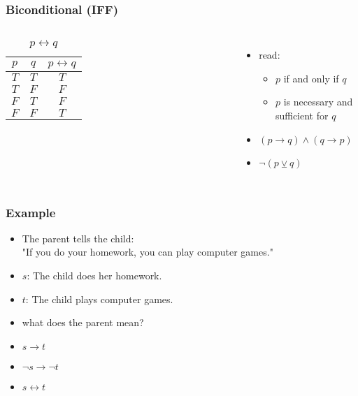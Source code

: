\documentclass[dvipsnames]{beamer}
\begin{document}
\begin{frame}
  \frametitle{Biconditional (IFF)}

  \begin{columns}
    \begin{table}
      \caption{$p \leftrightarrow q$}
      \begin{tabular}{|c|c||c|}\hline
        $p$ & $q$ & $p \leftrightarrow q$\\\hline\hline
        $T$ & $T$ & $T$\\\hline
        $T$ & $F$ & $F$\\\hline
        $F$ & $T$ & $F$\\\hline
        $F$ & $F$ & $T$\\\hline
      \end{tabular}
    \end{table}

    \pause
    \begin{itemize}
      \item read:
      \begin{itemize}
        \item $p$ if and only if $q$
        \item $p$ is necessary and sufficient for $q$
      \end{itemize}

      \pause
      \item $(p \rightarrow q) \wedge (q \rightarrow p)$
      \item $\neg (p \veebar q)$
    \end{itemize}
  \end{columns}
\end{frame}

\begin{frame}
  \frametitle{Example}

  \begin{example}
    \begin{itemize}
      \item The parent tells the child:\\
        "If you do your homework, you can play computer games."

      \pause
      \medskip
      \item $s$: The child does her homework.
      \item $t$: The child plays computer games.
      \item what does the parent mean?

      \pause
      \medskip
      \item $s \rightarrow t$
      \pause
      \item $\neg s \rightarrow \neg t$
      \pause
      \item $s \leftrightarrow t$
    \end{itemize}
  \end{example}
\end{frame}
\end{document}
